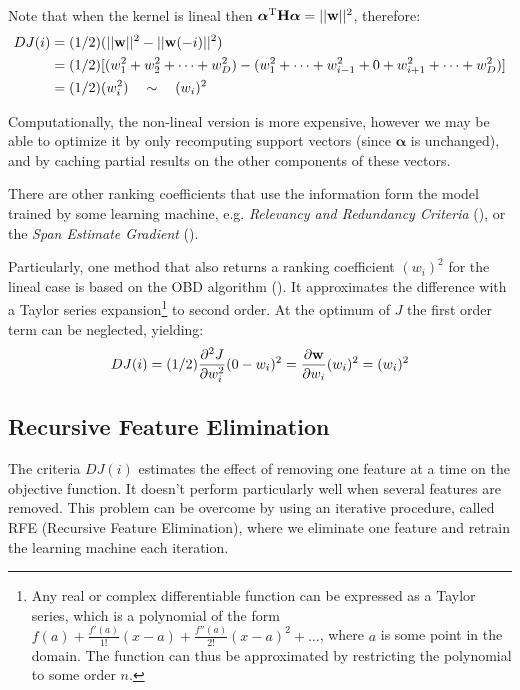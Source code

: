 Note that when the kernel is lineal then $\boldsymbol{\alpha}^{\text{T}} \mathbf{H} \boldsymbol{\alpha} = ||\mathbf{w}||^2$, therefore:
\begin{align*}
    DJ(i) &= (1/2)(||\mathbf{w}||^2 - ||\mathbf{w}(-i)||^2) \\
          &= (1/2)[(w_1^2 + w_2^2 + \dots + w_D^2) - (w_1^2 + \dots + w_{i-1}^2 + 0 + w_{i+1}^2 + \dots + w_D^2)] \\
          &= (1/2)(w_i^2) \quad \sim \quad (w_i)^2
\end{align*} 

Computationally, the non-lineal version is more expensive, however we may be able to optimize it by only recomputing support vectors (since $\boldsymbol{\alpha}$ is unchanged), and by caching partial results on the other components of these vectors.

\begin{sloppypar}
There are other ranking coefficients that use the information form the model trained by some learning machine, e.g. \emph{Relevancy and Redundancy Criteria} (\cite{mundra_svm-rfe_2007}), or the \emph{Span Estimate Gradient} (\cite{rakotomamonjy_variable_2003}).
\end{sloppypar}

Particularly, one method that also returns a ranking coefficient $(w_i)^2$ for the lineal case is based on the OBD algorithm (\cite{guyon_gene_2002}). It approximates the dif\-fer\-ence with a Taylor series expansion\footnote{Any real or complex differentiable function can be expressed as a Taylor series, which is a polynomial of the form $f(a) + \frac{f'(a)}{1!}(x - a) + \frac{f''(a)}{2!}(x - a)^2 + \dots$, where $a$ is some point in the domain. The function can thus be approximated by restricting the polynomial to some order $n$.} to second order. At the optimum of $J$ the first order term can be neglected, yielding:
\begin{align*}
    DJ(i) = (1/2) \frac{\partial^2 J}{\partial w_i^2} (0 - w_i)^2 = \frac{\partial \mathbf{w}}{\partial w_i} (w_i)^2 = (w_i)^2
\end{align*}

\subsection{Recursive Feature Elimination}

The criteria $DJ(i)$ estimates the effect of removing one feature at a time on the objective function. It doesn't perform particularly well when several features are removed. This problem can be overcome by using an iterative procedure, called RFE (Recursive Feature Elimination), where we eliminate one feature and retrain the learning machine each iteration.

